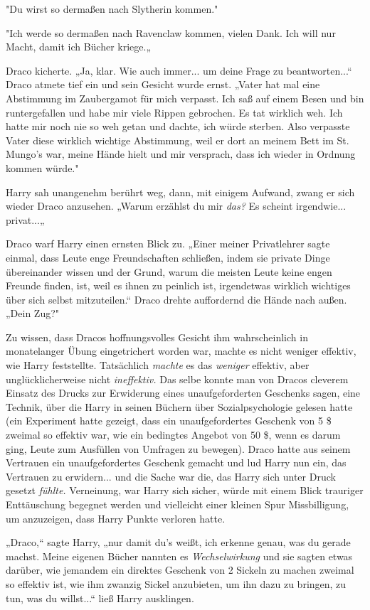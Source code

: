 {"Du wirst so dermaßen nach Slytherin kommen."

"Ich werde so dermaßen nach Ravenclaw kommen, vielen Dank. Ich will nur Macht, damit ich Bücher kriege.„

Draco kicherte. „Ja, klar. Wie auch immer... um deine Frage zu beantworten...“ Draco atmete tief ein und sein Gesicht wurde ernst. „Vater hat mal eine Abstimmung im Zaubergamot für mich verpasst. Ich saß auf einem Besen und bin runtergefallen und habe mir viele Rippen gebrochen. Es tat wirklich weh. Ich hatte mir noch nie so weh getan und dachte, ich würde sterben. Also verpasste Vater diese wirklich wichtige Abstimmung, weil er dort an meinem Bett im St. Mungo's war, meine Hände hielt und mir versprach, dass ich wieder in Ordnung kommen würde."

Harry sah unangenehm berührt weg, dann, mit einigem Aufwand, zwang er sich wieder Draco anzusehen. „Warum erzählst du mir \emph{das?} Es scheint irgendwie... privat...„

Draco warf Harry einen ernsten Blick zu. „Einer meiner Privatlehrer sagte einmal, dass Leute enge Freundschaften schließen, indem sie private Dinge übereinander wissen und der Grund, warum die meisten Leute keine engen Freunde finden, ist, weil es ihnen zu peinlich ist, irgendetwas wirklich wichtiges über sich selbst mitzuteilen.“ Draco drehte auffordernd die Hände nach außen. „Dein Zug?"

Zu wissen, dass Dracos hoffnungsvolles Gesicht ihm wahrscheinlich in monatelanger Übung eingetrichert worden war, machte es nicht weniger effektiv, wie Harry feststellte. Tatsächlich \emph{machte} es das \emph{weniger} effektiv, aber unglücklicherweise nicht \emph{ineffektiv.} Das selbe konnte man von Dracos cleverem Einsatz des Drucks zur Erwiderung eines unaufgeforderten Geschenks sagen, eine Technik, über die Harry in seinen Büchern über Sozialpsychologie gelesen hatte (ein Experiment hatte gezeigt, dass ein unaufgefordertes Geschenk von 5 \$ zweimal so effektiv war, wie ein bedingtes Angebot von 50 \$, wenn es darum ging, Leute zum Ausfüllen von Umfragen zu bewegen). Draco hatte aus seinem Vertrauen ein unaufgefordertes Geschenk gemacht und lud Harry nun ein, das Vertrauen zu erwidern... und die Sache war die, das Harry sich unter Druck gesetzt \emph{fühlte.} Verneinung, war Harry sich sicher, würde mit einem Blick trauriger Enttäuschung begegnet werden und vielleicht einer kleinen Spur Missbilligung, um anzuzeigen, dass Harry Punkte verloren hatte.

„Draco,“ sagte Harry, „nur damit du's weißt, ich erkenne genau, was du gerade machst. Meine eigenen Bücher nannten es \emph{Wechselwirkung} und sie sagten etwas darüber, wie jemandem ein direktes Geschenk von 2 Sickeln zu machen zweimal so effektiv ist, wie ihm zwanzig Sickel anzubieten, um ihn dazu zu bringen, zu tun, was du willst...“ ließ Harry ausklingen.

}
